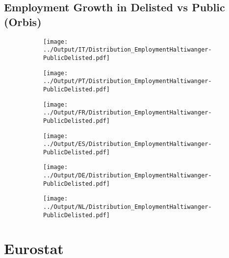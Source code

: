 \documentclass[12pt,notitlepage]{article}
\begin{document}
\subsection{Employment Growth in Delisted vs Public (Orbis)}
\begin{figure}[!htpb]
\centering
\begin{subfigure}{.49\textwidth}
    \centering
 \texttt{[image: ../Output/IT/Distribution\_EmploymentHaltiwanger-PublicDelisted.pdf]}
\end{subfigure}%
\begin{subfigure}{.49\textwidth}
    \centering
 \texttt{[image: ../Output/PT/Distribution\_EmploymentHaltiwanger-PublicDelisted.pdf]}
\end{subfigure}
\begin{subfigure}{.49\textwidth}
    \centering
 \texttt{[image: ../Output/FR/Distribution\_EmploymentHaltiwanger-PublicDelisted.pdf]}
\end{subfigure}%
\begin{subfigure}{.49\textwidth}
    \centering
 \texttt{[image: ../Output/ES/Distribution\_EmploymentHaltiwanger-PublicDelisted.pdf]}
\end{subfigure}
\begin{subfigure}{.49\textwidth}
    \centering
 \texttt{[image: ../Output/DE/Distribution\_EmploymentHaltiwanger-PublicDelisted.pdf]}
\end{subfigure}
\begin{subfigure}{.49\textwidth}
    \centering
 \texttt{[image: ../Output/NL/Distribution\_EmploymentHaltiwanger-PublicDelisted.pdf]}
\end{subfigure}
\end{figure}
\pagebreak




\FloatBarrier
\section{Eurostat} %
\label{sec:EuroStat}
\FloatBarrier
\end{document}
